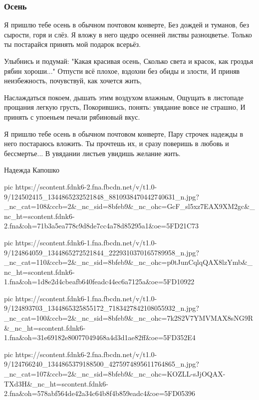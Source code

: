  
 
 

\subsubsection{Осень}
\label{sec:poetry.rus.nadezhda_koposhko.osen}

\obeycr
Я пришлю тебе осень в обычном почтовом конверте,
Без дождей и туманов, без сырости, горя и слёз.
Я вложу в него щедро осенней листвы разноцветье.
Только ты постарайся принять мой подарок всерьёз.

Улыбнись и подумай: "Какая красивая осень,
Сколько света и красок, как гроздья рябин хороши..."
Отпусти всё плохое, вздохни без обиды и злости,
И приняв неизбежность, почувствуй, как хочется жить,

Наслаждаться покоем, дышать этим воздухом влажным,
Ощущать в листопаде прощания легкую грусть,
Покорившись, понять: увядание вовсе не страшно,
И принять с упоеньем печали рябиновый вкус.

Я пришлю тебе осень в обычном почтовом конверте,
Пару строчек надежды в него постараюсь вложить.
Ты прочтешь их, и сразу поверишь в любовь и бессмертье...
В увядании листьев увидишь желание жить.

Надежда Капошко
\restorecr

\ifcmt
pic https://scontent.fdnk6-2.fna.fbcdn.net/v/t1.0-9/124502415_1344865232521848_8810938470442740631_n.jpg?_nc_cat=108&ccb=2&_nc_sid=8bfeb9&_nc_ohc=GcF_sl5xz7EAX9XM2gc&_nc_ht=scontent.fdnk6-2.fna&oh=71b3a5ea778c9d8de7cc4a78d85295a1&oe=5FD21C73

pic https://scontent.fdnk6-1.fna.fbcdn.net/v/t1.0-9/124864059_1344865272521844_2229310370165789958_n.jpg?_nc_cat=110&ccb=2&_nc_sid=8bfeb9&_nc_ohc=p0tJunCqlqQAX8lzYmb&_nc_ht=scontent.fdnk6-1.fna&oh=1d8e2d4cbeafb640feadc44ec6a7125a&oe=5FD10922

pic https://scontent.fdnk6-1.fna.fbcdn.net/v/t1.0-9/124893703_1344865325855172_7183427842108055932_n.jpg?_nc_cat=100&ccb=2&_nc_sid=8bfeb9&_nc_ohc=7k2S2V7YMVMAX8sNG9R&_nc_ht=scontent.fdnk6-1.fna&oh=31e69182e80077049468a4d3d1ae82ff&oe=5FD352E4

pic https://scontent.fdnk6-2.fna.fbcdn.net/v/t1.0-9/124766240_1344865379188500_4275974895611764865_n.jpg?_nc_cat=107&ccb=2&_nc_sid=8bfeb9&_nc_ohc=KOZLL-sJjOQAX-TXd3H&_nc_ht=scontent.fdnk6-2.fna&oh=578abf564de42a34c64b8f4b859eadc4&oe=5FD05396
\fi
